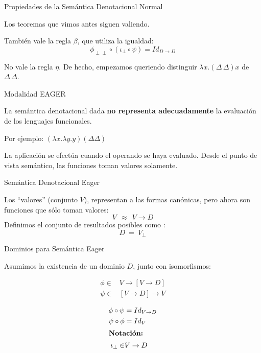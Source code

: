 \documentclass[handout]{beamer}
\begin{document}
\begin{frame}{Propiedades de la Semántica Denotacional Normal }

Los teoremas que vimos antes siguen valiendo. \pause

\bigskip

También vale la regla $\beta$, que utiliza la igualdad: 
\[\phi_{\perp\!\!\!\perp}\circ (\iota_\perp \circ \psi) = Id_{D\rightarrow D}\]
\pause
\bigskip

No vale la regla $\eta$. De hecho, empezamos queriendo distinguir $\lambda x.(\Delta\,\Delta) x$ de
$\Delta\,\Delta$.
\end{frame}










\begin{frame}{Modalidad EAGER}

  
La semántica denotacional dada \textbf{ no representa adecuadamente}
la evaluación de los lenguajes funcionales.
\pause

\bigskip


Por ejemplo: $(\lambda x. \lambda y. y) (\Delta\Delta)$


\bigskip

La aplicación se efectúa cuando el operando se haya evaluado. Desde el punto de vista semántico, las funciones toman valores solamente. 

\end{frame}




\begin{frame}{Semántica Denotacional Eager}

Los ``valores'' (conjunto $V$), representan a las formas canónicas,
 pero ahora son funciones que sólo toman valores:
\[ V\ \ \approx\ \  V\rightarrow D\]
\smallskip
Definimos el conjunto de resultados posibles como :
\[D \ =\ V_\perp\]

\end{frame}


\begin{frame}{Dominios para Semántica Eager}

  Asumimos la existencia de un dominio $D$, junto con isomorfismos:

  
\begin{align*}
\phi\in & V\rightarrow [V\rightarrow D]\\
\psi\in &[V\rightarrow D] \rightarrow V
\end{align*}

\begin{align*}
\phi \circ \psi &= Id_{V\rightarrow D}\\
  \psi\circ\phi &= Id_{V}\\
  \shortintertext{\textbf{Notación: }} 
  \iota_\perp\in & V\rightarrow D
\end{align*}

\end{frame}
\end{document}
